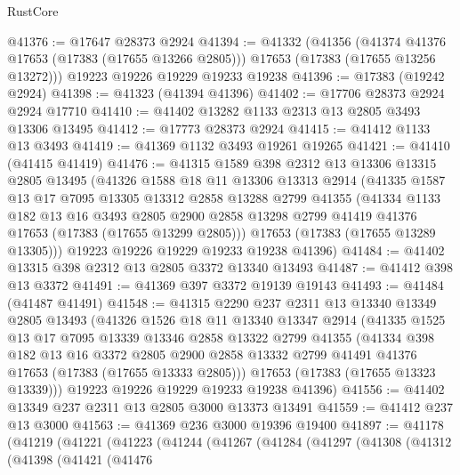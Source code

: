 \begin{lexlean}{RustCore}
\begin{coremodule}
@41376 := @17647 @28373 @2924
@41394 := @41332
    (@41356
      (@41374 @41376 @17653 (@17383 (@17655 @13266 @2805)))
      @17653
      (@17383 (@17655 @13256 @13272)))
    @19223
    @19226
    @19229
    @19233
    @19238
@41396 := @17383 (@19242 @2924)
@41398 := @41323 (@41394 @41396)
@41402 := @17706 @28373 @2924 @2924 @17710
@41410 := @41402 @13282 @1133 @2313 @13 @2805 @3493 @13306 @13495
@41412 := @17773 @28373 @2924
@41415 := @41412 @1133 @13 @3493
@41419 := @41369 @1132 @3493 @19261 @19265
@41421 := @41410 (@41415 @41419)
@41476 := @41315
    @1589
    @398
    @2312
    @13
    @13306
    @13315
    @2805
    @13495
    (@41326
      @1588
      @18
      @11
      @13306
      @13313
      @2914
      (@41335
        @1587
        @13
        @17
        @7095
        @13305
        @13312
        @2858
        @13288
        @2799
        @41355
        (@41334
          @1133
          @182
          @13
          @16
          @3493
          @2805
          @2900
          @2858
          @13298
          @2799
          @41419
          @41376
          @17653
          (@17383 (@17655 @13299 @2805)))
        @17653
        (@17383 (@17655 @13289 @13305)))
      @19223
      @19226
      @19229
      @19233
      @19238
      @41396)
@41484 := @41402 @13315 @398 @2312 @13 @2805 @3372 @13340 @13493
@41487 := @41412 @398 @13 @3372
@41491 := @41369 @397 @3372 @19139 @19143
@41493 := @41484 (@41487 @41491)
@41548 := @41315
    @2290
    @237
    @2311
    @13
    @13340
    @13349
    @2805
    @13493
    (@41326
      @1526
      @18
      @11
      @13340
      @13347
      @2914
      (@41335
        @1525
        @13
        @17
        @7095
        @13339
        @13346
        @2858
        @13322
        @2799
        @41355
        (@41334
          @398
          @182
          @13
          @16
          @3372
          @2805
          @2900
          @2858
          @13332
          @2799
          @41491
          @41376
          @17653
          (@17383 (@17655 @13333 @2805)))
        @17653
        (@17383 (@17655 @13323 @13339)))
      @19223
      @19226
      @19229
      @19233
      @19238
      @41396)
@41556 := @41402 @13349 @237 @2311 @13 @2805 @3000 @13373 @13491
@41559 := @41412 @237 @13 @3000
@41563 := @41369 @236 @3000 @19396 @19400
@41897 := @41178
    (@41219
      (@41221
        (@41223
          (@41244
            (@41267
              (@41284
                (@41297
                  (@41308
                    (@41312
                      (@41398
                        (@41421
                          (@41476

\end{coremodule}
\end{lexlean}
